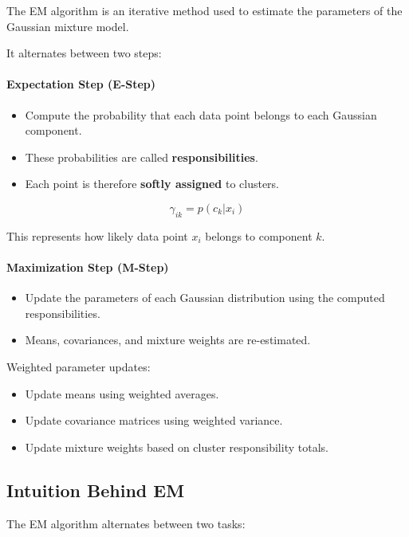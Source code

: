 \documentclass[10pt,a4paper]{article}
\begin{document}
	The EM algorithm is an iterative method used to estimate the parameters of the Gaussian mixture model.

	It alternates between two steps:

	\paragraph{Expectation Step (E-Step)}

	\begin{itemize}
		\item Compute the probability that each data point belongs to each Gaussian component.
		\item These probabilities are called \textbf{responsibilities}.
		\item Each point is therefore \textbf{softly assigned} to clusters.
	\end{itemize}

	\[
	\gamma_{ik} = p(c_k | x_i)
	\]

	This represents how likely data point $x_i$ belongs to component $k$.

	\paragraph{Maximization Step (M-Step)}

	\begin{itemize}
		\item Update the parameters of each Gaussian distribution using the computed responsibilities.
		\item Means, covariances, and mixture weights are re-estimated.
	\end{itemize}

	Weighted parameter updates:

	\begin{itemize}
		\item Update means using weighted averages.
		\item Update covariance matrices using weighted variance.
		\item Update mixture weights based on cluster responsibility totals.
	\end{itemize}

	\subsection{Intuition Behind EM}

	The EM algorithm alternates between two tasks:
\end{document}

